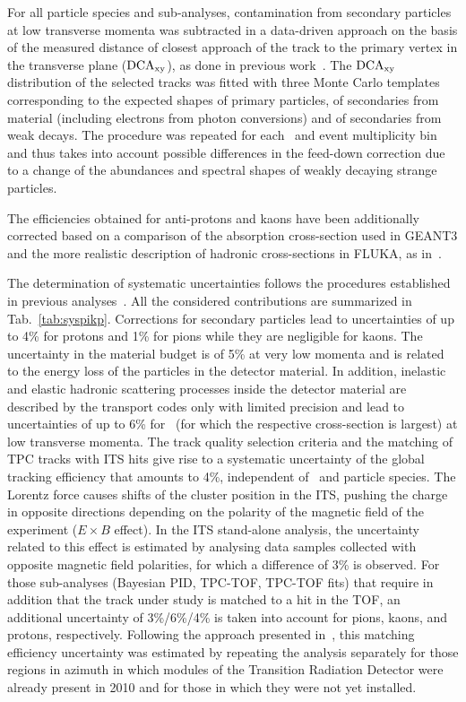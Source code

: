 For all particle species and sub-analyses, contamination from secondary particles at low transverse momenta was subtracted in a data-driven approach on the basis of the measured distance of closest approach of the track to the primary vertex in the transverse plane (${\rm DCA_{xy}}$), as done in previous work~\cite{Adam:2015qaa}. The ${\rm DCA_{xy}}$ distribution of the selected tracks was fitted with three Monte Carlo templates corresponding to the expected shapes of primary particles, of secondaries from material (including electrons from photon conversions) and of secondaries from weak decays. The procedure was repeated for each \pt\ and event multiplicity bin and thus takes into account possible differences in the feed-down correction due to a change of the abundances and spectral shapes of weakly decaying strange particles. 

The efficiencies obtained for anti-protons and kaons have been additionally corrected based on a comparison of the absorption cross-section used in GEANT3 and the more realistic description of hadronic cross-sections in FLUKA, as in~\cite{Adam:2015qaa,Abbas:2013rua}. 

The determination of systematic uncertainties follows the procedures established in previous analyses~\cite{Abelev:2013vea,Adam:2015qaa}. All the considered contributions are summarized in Tab.~\ref{tab:syspikp}. Corrections for secondary particles lead to uncertainties of up to 4\% for protons and 1\% for pions while they are negligible for kaons. The uncertainty in the material budget is of 5\% at very low momenta and is related to the energy loss of the particles in the detector material. In addition, inelastic and elastic hadronic scattering processes inside the detector material are described by the transport codes only with limited precision and lead to uncertainties of up to 6\% for \pbar\ (for which the respective cross-section is largest) at low transverse momenta. The track quality selection criteria and the matching of TPC tracks with ITS hits give rise to a systematic uncertainty of the global tracking efficiency that amounts to 4\%, independent of \pt\ and particle species. 
The Lorentz force causes shifts of the cluster position in the ITS, pushing the charge in opposite directions depending on the polarity of the magnetic field of the experiment ($E \times B$ effect). In the ITS stand-alone analysis, the uncertainty related to this effect is estimated by analysing data samples collected with opposite magnetic field polarities, for which a difference of 3\% is observed.
For those sub-analyses (Bayesian PID, TPC-TOF, TPC-TOF fits) that require in addition that the track under study is matched to a hit in the TOF, an additional uncertainty of 3\%/6\%/4\% is taken into account for pions, kaons, and protons, respectively. Following the approach presented in~\cite{Abelev:2013vea}, this matching efficiency uncertainty was estimated by repeating the analysis separately for those regions in azimuth in which modules of the Transition Radiation Detector were already present in 2010 and for those in which they were not yet installed.



